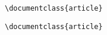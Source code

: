 \documentclass{article}
\newenvironment{xverbatim}{\verbatim}{\endverbatim}
\begin{document}
\begin{verbatim}
\documentclass{article}
\end{verbatim}

\begin{xverbatim}
\begin{verbatim}
\documentclass{article}
\end{verbatim}
\end{xverbatim}
\end{document}
